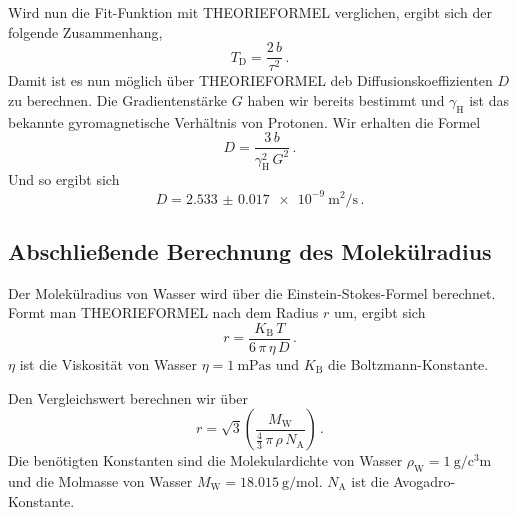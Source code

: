 Wird nun die Fit-Funktion mit THEORIEFORMEL verglichen, ergibt sich der folgende Zusammenhang,
\begin{equation}
    T_\text{D} = \frac{2 \, b}{\tau ^2} \, . 
    \label{eq:b_td}
\end{equation}
Damit ist es nun möglich über THEORIEFORMEL deb Diffusionskoeffizienten $D$ zu berechnen.
Die Gradientenstärke $G$ haben wir bereits bestimmt und $\gamma _\text{H}$ ist das bekannte gyromagnetische Verhältnis von Protonen.
Wir erhalten die Formel 
\begin{equation}
    D = \frac{3 \, b}{\gamma _\text{H}^2 \, G^2 } \, . 
    \label{eq:diffusion}
\end{equation}
Und so ergibt sich 
\begin{equation}
    D = \SI{2.533(17)e-9}{\meter\squared\per\second} \, . 
    \label{eq:diffusion_wert}
\end{equation}

\subsection{Abschließende Berechnung des Molekülradius}
\label{ssec:aus4}

Der Molekülradius von Wasser wird über die Einstein-Stokes-Formel berechnet.
Formt man THEORIEFORMEL nach dem Radius $r$ um, ergibt sich 
\begin{equation}
    r =  \frac{K_\text{B} \, T}{6 \, \pi \, \eta \, D } \, .
    \label{eq:stokes}
\end{equation}
$\eta$ ist die Viskosität von Wasser $\eta = \SI{1}{\meter\pascal\second} $ und $K_\text{B}$ die Boltzmann-Konstante.




Den Vergleichswert berechnen wir über
\begin{equation}
    r =  \sqrt{3}{ \left(  \frac{M_\text{W}}{\frac{4}{3} \, \pi \, \rho \, N_\text{A} }  \right)} \, .
    \label{eq:hexagonal}
\end{equation}
Die benötigten Konstanten sind die Molekulardichte von Wasser $\rho _\text{W} = \SI{1}{\gram\per\cubic\centi\meter}$ und die Molmasse von Wasser
$M _\text{W} = \SI{18.015}{\gram\per\mol}$. \cite{Wasser}
$N_\text{A}$ ist die Avogadro-Konstante.
